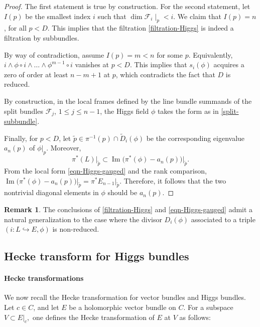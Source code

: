 \documentclass[twoside, 11pt]{article}
\numberwithin{equation}{section}
\theoremstyle{theorem}
\numberwithin{theorem}{section}
\theoremstyle{definition}
\newtheorem{remark}[remark]{Remark}
\begin{document}
\begin{proof}
The first statement is true by construction. For the second statement, let \(I(p)\) be the smallest index \(i\) such that 
\(\dim \mathcal{F}_i\mid_p < i\). We claim that \(I(p) = n\), for all $p<D$. This implies that the filtration \eqref{filtration-Higgs} 
is indeed a filtration by subbundles.

By way of contradiction, assume \(I(p)=m < n\) for some $p$. 
Equivalently, $i \wedge \phi\circ i \wedge \dots \wedge \phi^{m-1}\circ i$ vanishes at $p<D$. 
This implies that $s_i(\phi)$ acquires a zero of order at least $n-m+1$ at $p$, which contradicts the fact that $D$ is reduced.

By construction, in the local frames defined by the line bundle summands of the split bundles $\mathcal{F}_j$, $1 \leq j \leq n-1$, the Higgs field $\phi$ takes the form as in \eqref{split-subbundle}. 

Finally, for \(p < D\), let
\(\widetilde p \in \pi^{-1}(p)\cap\widetilde{D}_i(\phi)\) be the corresponding eigenvalue
\(a_n(p)\) of \(\phi|_p\). Moreover,
\[
\pi^*(L)|_{\tilde p}
\subset
\operatorname{Im}\bigl(\pi^*(\phi)-a_n(p)\bigr)\big|_{\tilde p}.
\]
From the local form \eqref{eqn-Higgs-gauged} and the rank comparison, 
\(\operatorname{Im}\bigl(\pi^*(\phi)-a_n(p)\bigr)\big|_{\tilde p} = \pi^*E_{n-1}|_{\tilde p}\). Therefore, it follows that the two nontrivial diagonal elements in $\phi$ should be $a_n(p)$.

\end{proof}

\begin{remark}
The conclusions of \eqref{filtration-Higgs} and \eqref{eqn-Higgs-gauged} admit a natural generalization to the case where the divisor \(D_i(\phi)\) associated to a triple \((i:L\hookrightarrow E,\phi)\) is non-reduced.
\end{remark}



\subsection{Hecke transform for Higgs bundles}
\paragraph{Hecke transformations}
We now recall the Hecke transformation for vector bundles and Higgs bundles. Let \(c\in C\), and let \(E\) be a holomorphic vector bundle on \(C\). For a subspace
\(
V\subset E|_c,
\)
one defines the Hecke transformation of $E$ at $V$ as follows:
\end{document}
